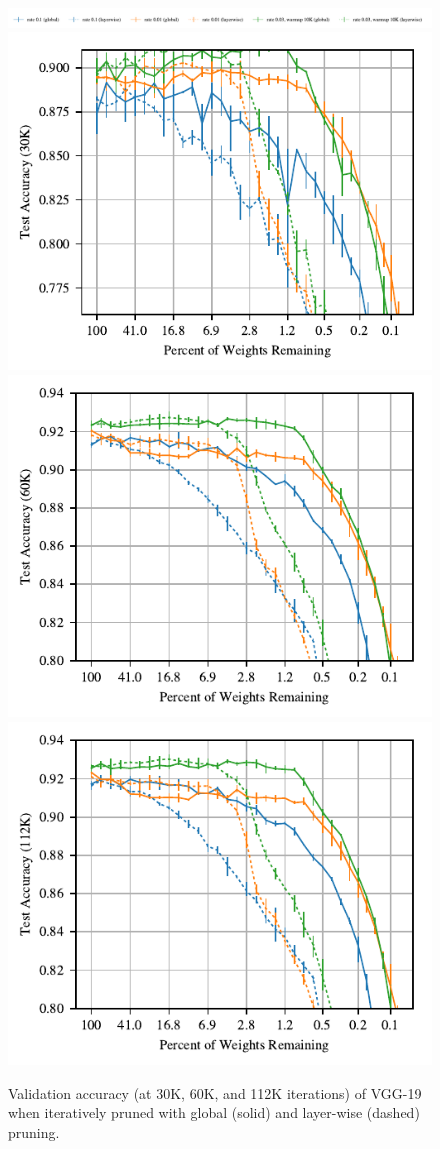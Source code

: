 \begin{figure}
\centering
\vspace{-.5em}
\includegraphics[width=.7\textwidth]{graphs/cifar10/icml/vgg19-iclr-layerwise-30000/legend}
\includegraphics[width=.33\textwidth]{graphs/cifar10/icml/vgg19-iclr-layerwise-30000/accuracy}%
\includegraphics[width=.33\textwidth]{graphs/cifar10/icml/vgg19-iclr-layerwise-60000/accuracy}%
\includegraphics[width=.33\textwidth]{graphs/cifar10/icml/vgg19-iclr-layerwise-112000/accuracy}%
\vspace{-1em}
\caption{Validation accuracy (at 30K, 60K, and 112K iterations) of VGG-19 when iteratively pruned with global (solid) and layer-wise (dashed) pruning.}
\label{fig:layerwise-vs-global-vgg}
\end{figure}

